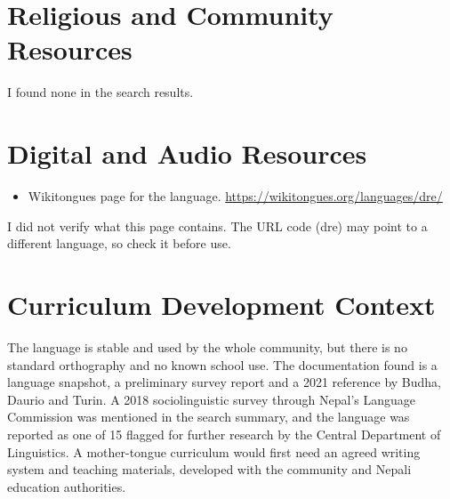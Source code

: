 \documentclass[12pt]{article}
\begin{document}
\section{Religious and Community Resources}
I found none in the search results.
\section{Digital and Audio Resources}
\begin{itemize}
\item Wikitongues page for the language. \url{https://wikitongues.org/languages/dre/}
\end{itemize}
I did not verify what this page contains. The URL code (dre) may point to a different language, so check it before use.
\section{Curriculum Development Context}
The language is stable and used by the whole community, but there is no standard orthography and no known school use. The documentation found is a language snapshot, a preliminary survey report and a 2021 reference by Budha, Daurio and Turin. A 2018 sociolinguistic survey through Nepal's Language Commission was mentioned in the search summary, and the language was reported as one of 15 flagged for further research by the Central Department of Linguistics. A mother-tongue curriculum would first need an agreed writing system and teaching materials, developed with the community and Nepali education authorities.
\end{document}
